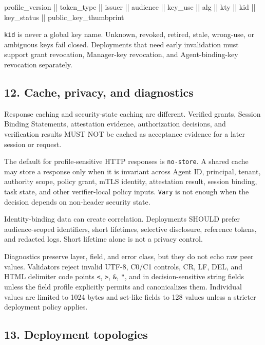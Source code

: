 \documentclass[
]{article}
\newenvironment{Shaded}{}{}
\newcommand{\NormalTok}[1]{#1}
\begin{document}
\begin{Shaded}
\begin{Highlighting}[]
\NormalTok{profile\_version || token\_type || issuer || audience ||}
\NormalTok{key\_use || alg || kty || kid || key\_status || public\_key\_thumbprint}
\end{Highlighting}
\end{Shaded}

\texttt{kid} is never a global key name. Unknown, revoked, retired,
stale, wrong-use, or ambiguous keys fail closed. Deployments that need
early invalidation must support grant revocation, Manager-key
revocation, and Agent-binding-key revocation separately.

\subsection{12. Cache, privacy, and
diagnostics}\label{cache-privacy-and-diagnostics}

Response caching and security-state caching are different. Verified
grants, Session Binding Statements, attestation evidence, authorization
decisions, and verification results MUST NOT be cached as acceptance
evidence for a later session or request.

The default for profile-sensitive HTTP responses is \texttt{no-store}. A
shared cache may store a response only when it is invariant across Agent
ID, principal, tenant, authority scope, policy grant, mTLS identity,
attestation result, session binding, task state, and other
verifier-local policy inputs. \texttt{Vary} is not enough when the
decision depends on non-header security state.

Identity-binding data can create correlation. Deployments SHOULD prefer
audience-scoped identifiers, short lifetimes, selective disclosure,
reference tokens, and redacted logs. Short lifetime alone is not a
privacy control.

Diagnostics preserve layer, field, and error class, but they do not echo
raw peer values. Validators reject invalid UTF-8, C0/C1 controls, CR,
LF, DEL, and HTML delimiter code points \texttt{\textless{}},
\texttt{\textgreater{}}, \texttt{\&}, \texttt{"}, and
\texttt{\textquotesingle{}} in decision-sensitive string fields unless
the field profile explicitly permits and canonicalizes them. Individual
values are limited to 1024 bytes and set-like fields to 128 values
unless a stricter deployment policy applies.

\subsection{13. Deployment topologies}\label{deployment-topologies}
\end{document}
